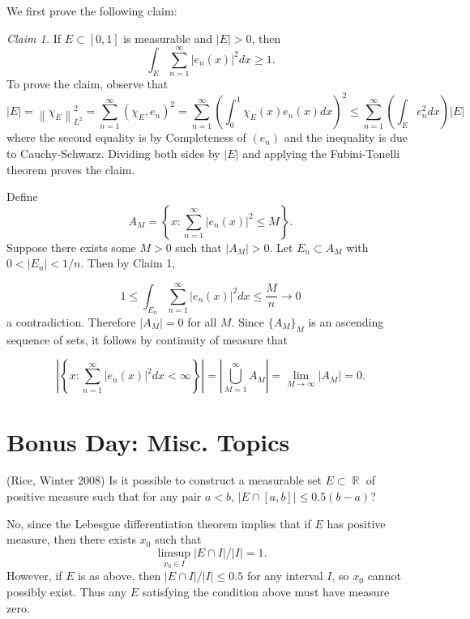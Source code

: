 \documentclass[answers]{exam}
\DeclareMathOperator{\RR}{\mathbb{R}}
\theoremstyle{problemstyle}
\newcommand{\norm}[1]{\left\lVert#1\right\rVert} %
\newcommand{\1}[1]{\textbf{1}_{\left[#1\right]}} %
\def\({\left (}
\def\){\right )}
\begin{document}
\begin{questions}
\begin{parts}
\begin{solution}
We first prove the following claim: 

  \textit{Claim 1.} If $E\subset [0,1]$ is measurable and $|E|>0$, then
  \begin{equation*}
    \int_{E} \sum_{n=1}^{\infty} \left| e_{n}(x) \right|^{2}dx \geq 1.
  \end{equation*}
  To prove the claim, observe that
  \begin{equation*}
    |E|= \norm{\chi_{E}}_{L^{2}}^{2}  = \sum_{n=1}^{\infty} (\chi_{E},e_{n})^{2} = \sum_{n=1}^{\infty} \left( \int_0^{1}\chi_{E}(x) e_{n}(x)dx \right)^{2}\leq \sum_{n=1}^{\infty} \(\int_{E} e_{n}^{2}dx \) |E|
  \end{equation*}
  where the second equality is by Completeness of $(e_{n})$ and the inequality is due to Cauchy-Schwarz. Dividing both sides by $|E|$ and applying the Fubini-Tonelli theorem proves the claim.

  Define
  \begin{equation*}
  A_M = \left\{ x:  \sum_{n=1}^{\infty} |e_n(x)|^2 \leq M\right\}.
  \end{equation*}
  Suppose there exists some $M>0$ such that $|A_M|>0$. Let $E_n\subset A_M$ with $0<|E_n|<1/n$. Then by Claim 1,
  
  $$1\leq \int_{E_n} \sum_{n=1}^{\infty} \left| e_{n}(x) \right|^{2}dx \leq \frac{M}{n} \to 0$$
  a contradiction. Therefore $|A_M|=0$ for all $M$. Since $\{A_M\}_M$ is an ascending sequence of sets, it follows by continuity of measure that
  
  $$\left|\left\{x: \sum_{n=1}^{\infty} |e_n(x)|^2 dx <\infty\right\}\right|=\left|\bigcup_{M=1}^{\infty} A_M\right| = \lim_{M\to\infty} |A_M| =0.$$
\end{solution}
\end{parts}





\newpage
\section{Bonus Day: Misc. Topics}

\question (Rice, Winter 2008) Is it possible to construct a measurable set $E \subset \RR$ of positive measure such that for any pair $a < b$, $|E \cap [a,b]| \leq 0.5 (b - a)$?
\begin{solution}
    No, since the Lebesgue differentiation theorem implies that if $E$ has positive measure, then there exists $x_0$ such that
    \[ \limsup_{x_0 \in I} |E \cap I|/|I| = 1. \]
    However, if $E$ is as above, then $|E \cap I| / |I| \leq 0.5$ for any interval $I$, so $x_0$ cannot possibly exist. Thus any $E$ satisfying the condition above must have measure zero.
\end{solution}


\end{questions}
\end{document}
